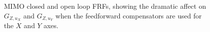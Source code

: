 \documentclass[twocolumn,twoside]{IEEEtran/IEEEtran}
\begin{document}
\begin{figure}
  \centering
  
  \caption{MIMO closed and open loop FRFs, showing the dramatic affect on $G_{Z,u_X}$ and $G_{Z,u_Y}$ when the feedforward compensators are used for the $X$ and $Y$ axes.}
  \label{fig:mimo_frf_uxuy}
\end{figure}

%     

\end{document}
